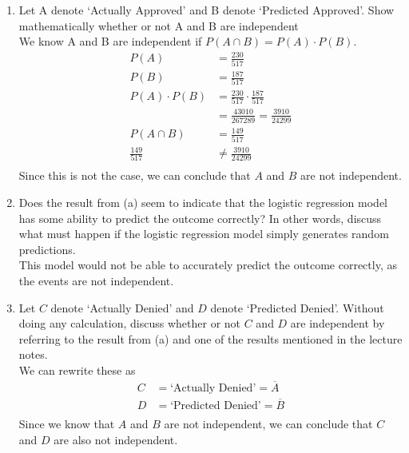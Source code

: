 \documentclass{article}
\begin{document}
\begin{enumerate}[label=\alph*)]
    \item Let A denote ‘Actually Approved’ and B denote ‘Predicted Approved’. Show
          mathematically whether or not A and B are independent \\
          We know A and B are independent if \(P(A \cap B) = P(A) \cdot P(B)\).
          \begin{align*}
              P(A)            & = \frac{230}{517}                           \\
              P(B)            & = \frac{187}{517}                           \\
              P(A) \cdot P(B) & = \frac{230}{517} \cdot \frac{187}{517}     \\
                              & = \frac{43010}{267289} = \frac{3910}{24299} \\
              P(A \cap B)     & = \frac{149}{517}                           \\
              \frac{149}{517} & \neq \frac{3910}{24299}                     \\
          \end{align*}
          Since this is not the case, we can conclude that \(A\) and \(B\) are not independent.
    \item Does the result from (a) seem to indicate that the logistic regression model has some
          ability to predict the outcome correctly? In other words, discuss what must happen if the
          logistic regression model simply generates random predictions. \\
          This model would not be able to accurately predict the outcome correctly, as the events are not independent.
    \item Let \(C\) denote ‘Actually Denied’ and \(D\) denote ‘Predicted Denied’. Without doing any
          calculation, discuss whether or not \(C\) and \(D\) are independent by referring to the result from (a)
          and one of the results mentioned in the lecture notes. \\
          We can rewrite these as
          \begin{align*}
              C & = \text{`Actually Denied'} = \overline{A}  \\
              D & = \text{`Predicted Denied'} = \overline{B} \\
          \end{align*}
          Since we know that \(A\) and \(B\) are not independent, we can conclude that \(C\) and \(D\) are also not independent.
\end{enumerate}
\end{document}
